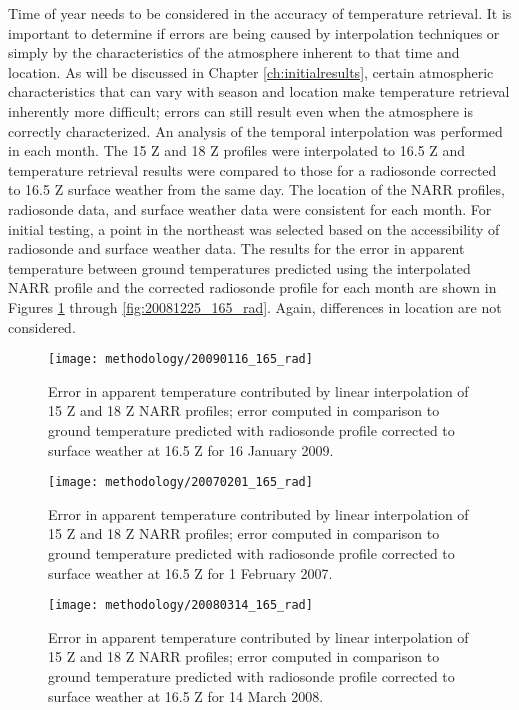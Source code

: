 \documentclass{book}
\begin{document}
Time of year needs to be considered in the accuracy of temperature retrieval.  It is important to determine if errors are being caused by interpolation techniques or simply by the characteristics of the atmosphere inherent to that time and location.  As will be discussed in Chapter \ref{ch:initialresults}, certain atmospheric characteristics that can vary with season and location make temperature retrieval inherently more difficult; errors can still result even when the atmosphere is correctly characterized.  An analysis of the temporal interpolation was performed in each month.  The 15 Z and 18 Z profiles were interpolated to 16.5 Z and temperature retrieval results were compared to those for a radiosonde corrected to 16.5 Z surface weather from the same day.  The location of the NARR profiles, radiosonde data, and surface weather data were consistent for each month.  For initial testing, a point in the northeast was selected based on the accessibility of radiosonde and surface weather data.  The results for the error in apparent temperature between ground temperatures predicted using the interpolated NARR profile and the corrected radiosonde profile for each month are shown in Figures \ref{fig:20090116_165_rad} through \ref{fig:20081225_165_rad}.  Again, differences in location are not considered.

\begin{figure}[H]
\centering
\texttt{[image: methodology/20090116\_165\_rad]}
\caption{Error in apparent temperature contributed by linear interpolation of 15 Z and 18 Z NARR profiles; error computed in comparison to ground temperature predicted with radiosonde profile corrected to surface weather at 16.5 Z for 16 January 2009.}
\label{fig:20090116_165_rad}
\end{figure}

\begin{figure}[H]
\centering
\texttt{[image: methodology/20070201\_165\_rad]}
\caption{Error in apparent temperature contributed by linear interpolation of 15 Z and 18 Z NARR profiles; error computed in comparison to ground temperature predicted with radiosonde profile corrected to surface weather at 16.5 Z for 1 February 2007.}
\label{fig:20070201_165_rad}
\end{figure}

\begin{figure}[H]
\centering
\texttt{[image: methodology/20080314\_165\_rad]}
\caption{Error in apparent temperature contributed by linear interpolation of 15 Z and 18 Z NARR profiles; error computed in comparison to ground temperature predicted with radiosonde profile corrected to surface weather at 16.5 Z for 14 March 2008.}
\label{fig:20080314_165_rad}
\end{figure}
\end{document}
